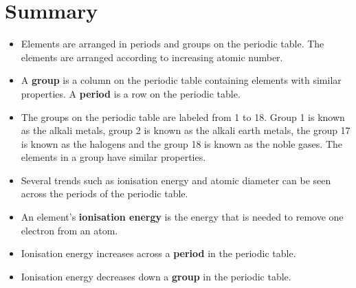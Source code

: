             \section{Summary}
            \nopagebreak
            \label{m38757*uid0123}\begin{itemize}[noitemsep]
            \label{m38757*id79342}\item Elements are arranged in periods and groups on the periodic table. The elements are arranged according to increasing atomic number. 
\label{m38757*id97342}\item A \textbf{group} is a column on the periodic table containing elements with similar properties. A \textbf{period} is a row on the periodic table.
\item The groups on the periodic table are labeled from 1 to 18. Group 1 is known as the alkali metals, group 2 is known as the alkali earth metals, the group 17 is known as the halogens and the group 18 is known as the noble gases. The elements in a group have similar properties.
\item Several trends such as ionisation energy and atomic diameter can be seen across the periods of the periodic table. \label{m38757*uid184}
\label{m38757*uid186}\item An element's \textbf{ionisation energy} is the energy that is needed to remove one electron from an atom.
\label{m38757*uid187}\item Ionisation energy increases across a \textbf{period} in the periodic table.
\label{m38757*uid188}\item Ionisation energy decreases down a \textbf{group} in the periodic table.
\end{itemize}
        \label{m38757*eip-219}
            




